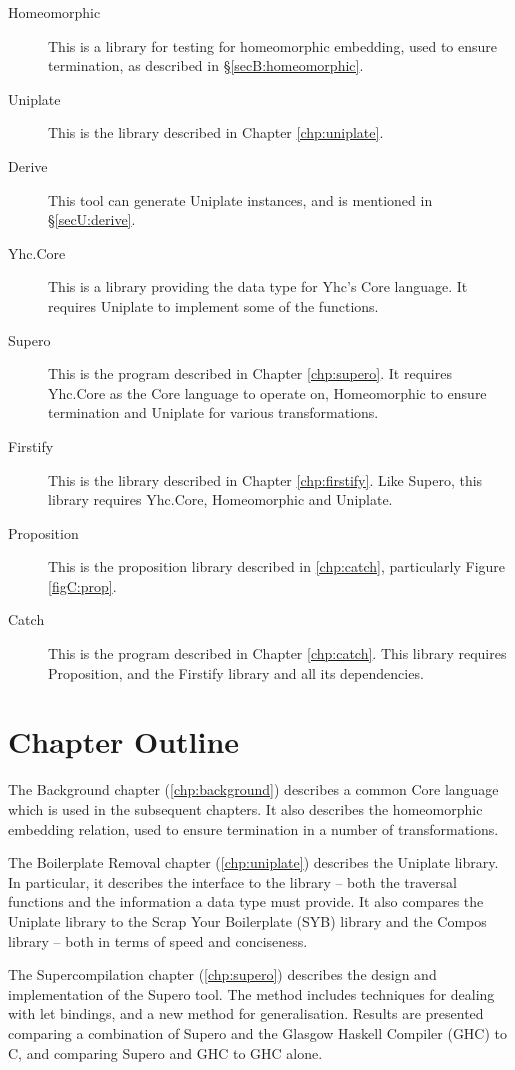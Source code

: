 \begin{description}
\item[Homeomorphic] This is a library for testing for homeomorphic embedding, used to ensure termination, as described in \S\ref{secB:homeomorphic}.
\item[Uniplate] This is the library described in Chapter \ref{chp:uniplate}.
\item[Derive] This tool can generate Uniplate instances, and is mentioned in \S\ref{secU:derive}.
\item[Yhc.Core] This is a library providing the data type for Yhc's Core language. It requires Uniplate to implement some of the functions.
\item[Supero] This is the program described in Chapter \ref{chp:supero}. It requires Yhc.Core as the Core language to operate on, Homeomorphic to ensure termination and Uniplate for various transformations.
\item[Firstify] This is the library described in Chapter \ref{chp:firstify}. Like Supero, this library requires Yhc.Core, Homeomorphic and Uniplate.
\item[Proposition] This is the proposition library described in \ref{chp:catch}, particularly Figure \ref{figC:prop}.
\item[Catch] This is the program described in Chapter \ref{chp:catch}. This library requires Proposition, and the Firstify library and all its dependencies.
\end{description}

\section{Chapter Outline}
\label{secI:chapters}

The Background chapter (\ref{chp:background}) describes a common Core language which is used in the subsequent chapters. It also describes the homeomorphic embedding relation, used to ensure termination in a number of transformations.

The Boilerplate Removal chapter (\ref{chp:uniplate}) describes the Uniplate library. In particular, it describes the interface to the library -- both the traversal functions and the information a data type must provide. It also compares the Uniplate library to the Scrap Your Boilerplate (SYB) library \cite{lammel:syb} and the Compos library \cite{bringert:compos} -- both in terms of speed and conciseness.

The Supercompilation chapter (\ref{chp:supero}) describes the design and implementation of the Supero tool. The method includes techniques for dealing with let bindings, and a new method for generalisation. Results are presented comparing a combination of Supero and the Glasgow Haskell Compiler (GHC) \cite{ghc} to C, and comparing Supero and GHC to GHC alone.


